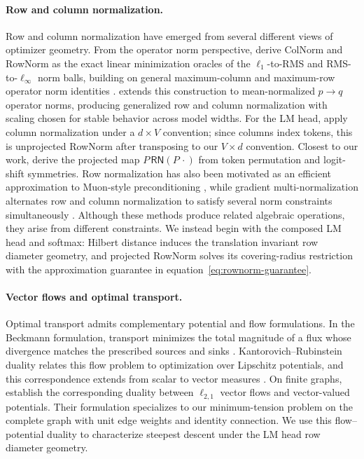 \documentclass[anon]{opt2026} %
\begin{document}
\paragraph{Row and column normalization.}
Row and column normalization have emerged from several different views of optimizer geometry. From the operator norm perspective, \citet{pethick2025trainingdeeplearningmodels} derive ColNorm and RowNorm as the exact linear minimization oracles of the $\ell_1$-to-RMS and RMS-to-$\ell_\infty$ norm balls, building on general maximum-column and maximum-row operator norm identities \citep{bernstein2024old,bernstein2024modular}. \citet{xu2026widthscalingneuraloptimizers} extends this construction to mean-normalized $p\rightarrow q$ operator norms, producing generalized row and column normalization with scaling chosen for stable behavior across model widths. For the LM head, \citet{glentis2026memoryefficientllmpretrainingminimalist} apply column normalization under a $d\times V$ convention; since columns index tokens, this is unprojected RowNorm after transposing to our $V\times d$ convention. Closest to our work, \citet{lau2026symmetry} derive the projected map $P\,\mathsf{RN}(P\,\cdot)$ from token permutation and logit-shift symmetries. Row normalization has also been motivated as an efficient approximation to Muon-style preconditioning \citep{deng2026rmnprowmomentumnormalizedpreconditioning}, while gradient multi-normalization alternates row and column normalization to satisfy several norm constraints simultaneously \citep{scetbon2025gradientmultinormalizationstatelessscalable}. Although these methods produce related algebraic operations, they arise from different constraints. We instead begin with the composed LM head and softmax: Hilbert distance induces the translation invariant row diameter geometry, and projected RowNorm solves its covering-radius restriction with the approximation guarantee in equation~\ref{eq:rownorm-guarantee}.


\paragraph{Vector flows and optimal transport.}
Optimal transport admits complementary potential and flow formulations. In
the Beckmann formulation, transport minimizes the total magnitude of a flux
whose divergence matches the prescribed sources and sinks
\citep{b89ef164-61eb-3086-8dda-c0a165a1b822}. Kantorovich--Rubinstein duality
relates this flow problem to optimization over Lipschitz potentials, and this
correspondence extends from scalar to vector measures
\citep{ciosmak2021optimaltransportvectormeasures,
ciosmak2021matrixholdersinequalitydivergence}. On finite graphs,
\citet{robertson2025generalizationwassersteindistancebeckmann} establish the
corresponding duality between $\ell_{2,1}$ vector flows and vector-valued
potentials. Their formulation specializes to our minimum-tension problem on
the complete graph with unit edge weights and identity connection. We use
this flow--potential duality to characterize steepest descent under the
LM head row diameter geometry.
\end{document}
